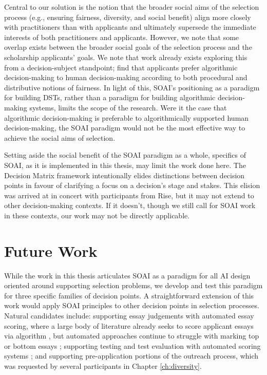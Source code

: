Central to our solution is the notion that the broader social aims of the selection process (e.g., ensuring fairness, diversity, and social benefit) align more closely with practitioners than with applicants and ultimately supersede the immediate interests of both practitioners and applicants. However, we note that some overlap exists between the broader social goals of the selection process and the scholarship applicants' goals. We note that work already exists exploring this from a decision-subject standpoint; \textcite{10.1145/3351095.3372867} find that applicants prefer algorithmic decision-making to human decision-making according to both procedural and distributive notions of fairness. In light of this, SOAI's positioning as a paradigm for building DSTs, rather than a paradigm for building algorithmic decision-making systems, limits the scope of the research. Were it the case that algorithmic decision-making is preferable to algorithmically supported human decision-making, the SOAI paradigm would not be the most effective way to achieve the social aims of selection.

Setting aside the social benefit of the SOAI paradigm as a whole, specifics of SOAI, as it is implemented in this thesis, may limit the work done here. The Decision Matrix framework intentionally elides distinctions between decision points in favour of clarifying a focus on a decision's stage and stakes. This elision was arrived at in concert with participants from Rise, but it may not extend to other decision-making contexts. If it doesn't, though we still call for SOAI work in these contexts, our work may not be directly applicable.

\section{Future Work}
While the work in this thesis articulates SOAI as a paradigm for all AI design oriented around supporting selection problems, we develop and test this paradigm for three specific families of decision points. A straightforward extension of this work would apply SOAI principles to other decision points in selection processes. Natural candidates include: supporting essay judgements with automated essay scoring, where a large body of literature already seeks to score applicant essays via algorithm \cite{cozma_automated_2018,ramesh_automated_2022,wang_use_2022,elijahthesis}, but automated approaches continue to struggle with marking top or bottom essays \cite{elijahthesis}; supporting testing and test evaluation with automated scoring systems \cite{organisciak_beyond_2023,condon2014international}; and supporting pre-application portions of the outreach process, which was requested by several participants in Chapter \ref{ch:diversity}.


